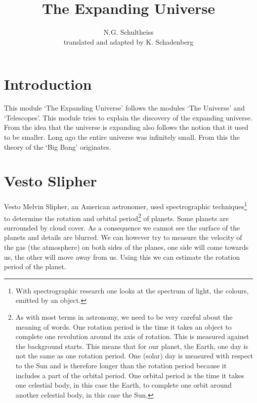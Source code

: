 


\author{N.G. Schultheiss \\ translated and adapted by K. Schadenberg}
\date{}
\title{The Expanding Universe}



\maketitle

\section{Introduction}
This module `The Expanding Universe' follows the modules `The Universe' and `Telescopes'. This module tries to explain the discovery of the expanding universe. From the idea that the universe is expanding also follows the notion that it used to be smaller. Long ago the entire universe was infinitely small. From this the theory of the `Big Bang' originates.

\section{Vesto Slipher}
Vesto Melvin Slipher, an American astronomer, used spectrographic techniques\footnote{With spectrographic research one looks at the spectrum of light, the colours, emitted by an object.} to determine the rotation and orbital period\footnote{As with most terms in astronomy, we need to be very careful about the meaning of words. One rotation period is the time it takes an object to complete one revolution around its axis of rotation. This is measured against the background starts. This means that for our planet, the Earth, one day is not the same as one rotation period. One (solar) day is measured with respect to the Sun and is therefore longer than the rotation period because it includes a part of the orbital period. One orbital period is the time it takes one celestial body, in this case the Earth, to complete one orbit around another celestial body, in this case the Sun.} of planets. Some planets are surrounded by cloud cover. As a consequence we cannot see the surface of the planets and details are blurred. We can however try to measure the velocity of the gas (the atmosphere) on both sides of the planes, one side will come towards us, the other will move away from us. Using this we can estimate the rotation period of the planet.


